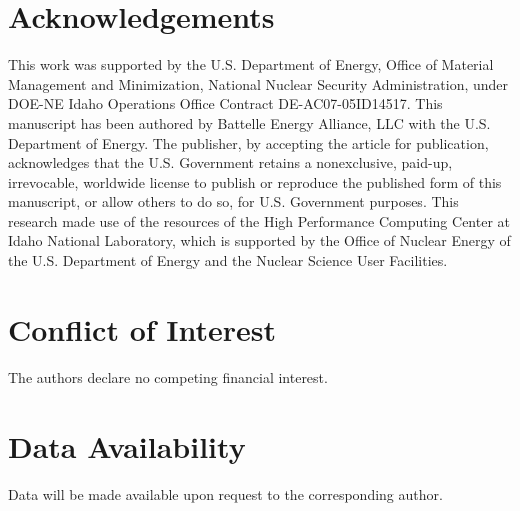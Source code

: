 \documentclass[default]{sn-jnl}%
\begin{document}
\section{Acknowledgements}\label{sec5}
This work was supported by the U.S. Department of Energy, Office of Material Management and Minimization, National Nuclear Security Administration, under DOE-NE Idaho Operations Office Contract DE-AC07-05ID14517. This manuscript has been authored by Battelle Energy Alliance, LLC with the U.S. Department of Energy. The publisher, by accepting the article for publication, acknowledges that the U.S. Government retains a nonexclusive, paid-up, irrevocable, worldwide license to publish or reproduce the published form of this manuscript, or allow others to do so, for U.S. Government purposes. This research made use of the resources of the High Performance Computing Center at Idaho National Laboratory, which is supported by the Office of Nuclear Energy of the U.S. Department of Energy and the Nuclear Science User Facilities.

\section{Conflict of Interest}\label{sec6}
The authors declare no competing financial interest.

\section{Data Availability}\label{sec7}
Data will be made available upon request to the corresponding author. 



\end{document}
